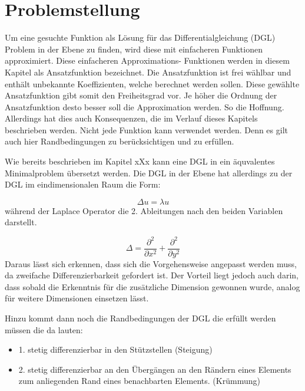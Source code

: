 %
%
%
\section{Problemstellung
\label{fem:section:problemstellung}}

Um eine gesuchte Funktion als Lösung für das Differentialgleichung (DGL) Problem in der Ebene zu finden, wird diese mit einfacheren Funktionen approximiert. Diese einfacheren Approximations- Funktionen werden in diesem Kapitel als Ansatzfunktion bezeichnet. Die Ansatzfunktion ist frei wählbar und enthält unbekannte Koeffizienten, welche berechnet werden sollen. Diese gewählte Ansatzfunktion gibt somit den Freiheitsgrad vor. Je höher die Ordnung der Ansatzfunktion desto besser soll die Approximation werden. So die Hoffnung. Allerdings hat dies auch Konsequenzen, die im Verlauf dieses Kapitels beschrieben werden. Nicht jede Funktion kann verwendet werden. Denn es  gilt auch hier Randbedingungen zu berücksichtigen und zu erfüllen. 

Wie bereits beschrieben im Kapitel xXx kann eine DGL in ein äquvalentes Minimalproblem übersetzt werden. Die DGL in der Ebene hat allerdings zu der DGL im eindimensionalen Raum die Form:

\begin{equation}
	\Delta u = \lambda u
	\label{fem:DGL2D}
\end{equation} 
während der Laplace Operator die 2. Ableitungen nach den beiden Variablen darstellt.

\begin{equation}
	\Delta = \frac{\partial ^2}{\partial x^2} + \frac{\partial ^2}{\partial y^2}
\end{equation} 
Daraus lässt sich erkennen, dass sich die Vorgehensweise angepasst werden muss, da zweifache Differenzierbarkeit gefordert ist. Der Vorteil liegt jedoch auch darin, dass sobald die Erkenntnis für die zusätzliche Dimension gewonnen wurde, analog für weitere Dimensionen einsetzen lässt.

Hinzu kommt dann noch die Randbedingungen der DGL die erfüllt werden müssen die da lauten:
\begin{itemize}
	\item 1. stetig differenzierbar in den Stützstellen (Steigung)
	\item 2. stetig differenzierbar an den Übergängen an den Rändern eines Elements zum anliegenden Rand eines benachbarten Elements. (Krümmung)
\end{itemize}

